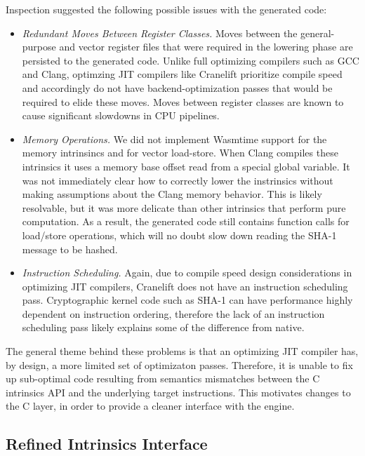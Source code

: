 Inspection suggested the following possible issues with the generated code:
%
\begin{itemize}
    \item \emph{Redundant Moves Between Register Classes.}
        Moves between the general-purpose and vector register files that were
        required in the lowering phase are persisted to the generated code.
        Unlike full optimizing compilers such as GCC and Clang, optimzing JIT
        compilers like Cranelift prioritize compile speed and accordingly do not
        have backend-optimization passes that would be required to elide these
        moves. Moves between register classes are known to cause significant
        slowdowns in CPU pipelines.
    \item \emph{Memory Operations.}
        We did not implement Wasmtime support for the memory intrinsincs
         and  for vector load-store. When
        Clang compiles these intrinsics it uses a memory base offset read from a
        special global variable. It was not immediately clear how to correctly
        lower the instrinsics without making assumptions about the Clang memory
        behavior. This is likely resolvable, but it was more delicate than other
        intrinsics that perform pure computation. As a result, the generated
        code still contains function calls for load/store operations, which will
        no doubt slow down reading the SHA-1 message to be hashed.
    \item \emph{Instruction Scheduling.}
        Again, due to compile speed design considerations in optimizing JIT
        compilers, Cranelift does not have an instruction scheduling pass.
        Cryptographic kernel code such as SHA-1 can have performance highly
        dependent on instruction ordering, therefore the lack of an instruction
        scheduling pass likely explains some of the difference from native.
\end{itemize}

The general theme behind these problems is that an optimizing JIT compiler has,
by design, a more limited set of optimizaton passes. Therefore, it is unable to
fix up sub-optimal code resulting from semantics mismatches between the C
intrinsics API and the underlying target instructions. This motivates changes to
the C layer, in order to provide a cleaner interface with the \wasm engine.

\subsection{Refined Intrinsics Interface}

